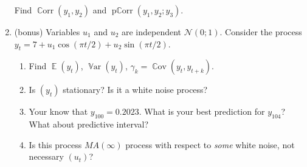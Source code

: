 \documentclass[12pt]{article}
\DeclareMathOperator{\Cov}{\mathbb{C}ov}
\DeclareMathOperator{\Corr}{\mathbb{C}orr}
\DeclareMathOperator{\Var}{\mathbb{V}ar}
\DeclareMathOperator{\E}{\mathbb{E}}
\DeclareMathOperator{\pCorr}{\mathrm{p}\mathbb{C}\mathrm{orr}}
\newcommand \cN{\mathcal{N}}
\begin{document}
\begin{enumerate}
  Find $\Corr(y_1, y_2)$ and $\pCorr(y_1, y_2 ; y_3)$.


  \item (bonus) Variables $u_1$ and $u_2$ are independent $\cN(0;1)$. 
  Consider the process $y_t = 7 + u_1 \cos (\pi t /2) + u_2 \sin (\pi t /2)$.

  \begin{enumerate}
    \item Find $\E(y_t)$, $\Var(y_t)$, $\gamma_k = \Cov(y_t, y_{t+k})$. 
    \item Is $(y_t)$ stationary? Is it a white noise process?
    \item Your know that $y_{100} = 0.2023$. What is your best prediction for $y_{104}$? What about predictive interval?
    \item Is this process $MA(\infty)$ process with respect to \textit{some} white noise, not necessary $(u_t)$?
  \end{enumerate}
  
\end{enumerate}



\newpage
\end{document}
